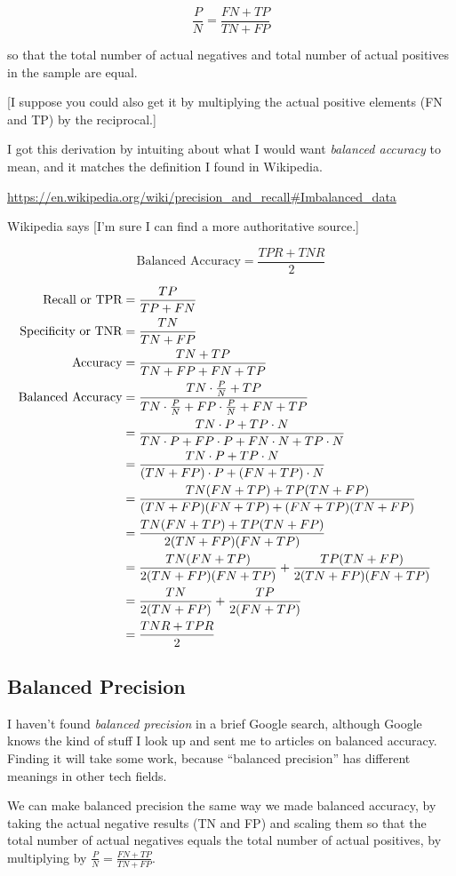 $$\frac{P}{N} = \frac{FN+TP}{TN+FP}$$

so that the total number of actual negatives and total number of actual positives in the sample are equal.

[I suppose you could also get it by multiplying the actual positive elements (FN and TP) by the reciprocal.]

I got this derivation by intuiting about what I would want {\it balanced accuracy} to mean, and it matches the definition I found in Wikipedia.  

\url{https://en.wikipedia.org/wiki/precision_and_recall#Imbalanced_data}

Wikipedia says [I'm sure I can find a more authoritative source.]

$$\text{Balanced Accuracy} = \frac{TPR + TNR}{2}$$

\begin{align*}
	\text{Recall or TPR} &= \frac{TP}{TP+FN} \cr
	\text{Specificity or TNR} &= \frac{TN}{TN+FP} \cr
	\text{Accuracy} &= \frac{TN+TP}{TN+FP+FN+TP} \cr
	\text{Balanced Accuracy} &=  \frac{TN \cdot \frac{P}{N}+TP}{TN \cdot \frac{P}{N}+FP \cdot \frac{P}{N}+FN+TP} \cr
		&= \frac{TN \cdot P+TP \cdot N}{TN \cdot P+FP \cdot P+FN \cdot N+TP\cdot N} \cr
	&= \frac{TN \cdot P+TP \cdot N}{(TN+FP) \cdot P+(FN+TP) \cdot  N} \cr
	&= \frac{TN (FN+TP)+TP (TN+FP)}{(TN+FP) (FN+TP)+(FN+TP) (TN+FP)} \cr
	&= \frac{TN (FN+TP)+TP (TN+FP)}{2(TN+FP) (FN+TP)} \cr
	&= \frac{TN (FN+TP)}{2(TN+FP) (FN+TP)}  + \frac{TP (TN+FP)}{2(TN+FP) (FN+TP)} \cr
	&= \frac{TN}{2(TN+FP) }  + \frac{TP }{2 (FN+TP)} \cr
	&= \frac{TNR+TPR}{2} \cr
\end{align*}

\subsection{Balanced Precision}

I haven't found {\it balanced precision} in a brief Google search, although Google knows the kind of stuff I look up and sent me to articles on balanced accuracy.  Finding it will take some work, because ``balanced precision'' has different meanings in other tech fields.  

We can make balanced precision the same way we made balanced accuracy, by taking the actual negative results (TN and FP) and scaling them  so that the total number of actual negatives equals the total number of actual positives, by multiplying by $\frac{P}{N} = \frac{FN+TP}{TN+FP}$.

